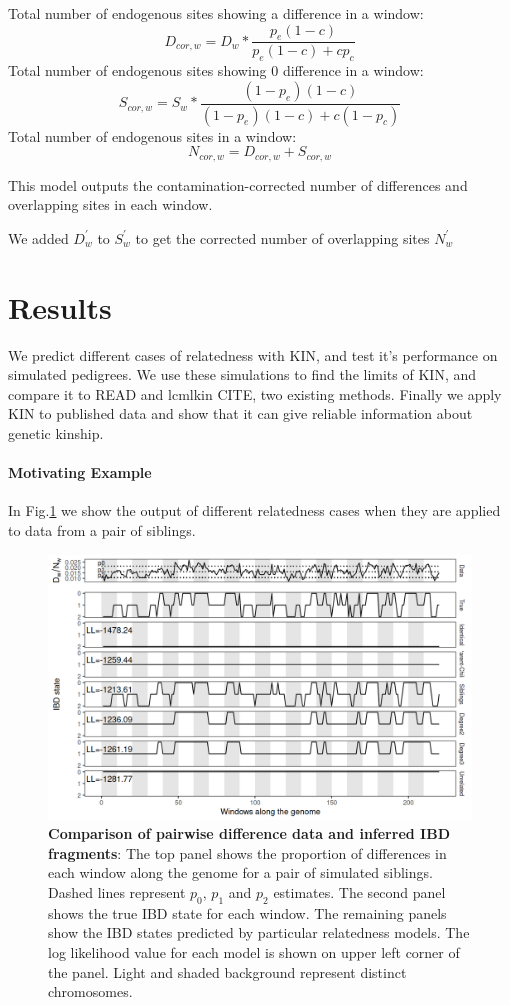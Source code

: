 \documentclass[12pt, letterpaper]{article}
\begin{document}
Total number of endogenous sites showing a difference in a window: 
$$D_{cor,w} = D_w* \frac{p_e(1-c)}{p_e(1-c) + c p_c} $$
Total number of endogenous sites showing 0 difference in a window: 
$$S_{cor,w} = S_w* \frac{(1-p_e)(1-c)}{(1-p_e)(1-c) + c (1-p_c)} $$
Total number of endogenous sites in a window:
$$N_{cor,w} = D_{cor,w} + S_{cor,w}$$

This model outputs the contamination-corrected number of differences and overlapping sites in each window.


We added $D_w^{'}$ to $S_w^{'}$ to get the corrected number of overlapping sites $N_w^{'}$  


\section{Results}\label{results}



We predict different cases of relatedness with KIN, and test it's performance on simulated pedigrees. We use these simulations to find the limits of KIN, and compare it to READ and lcmlkin CITE, two existing methods. Finally we apply KIN to published data and show that it can give reliable information about genetic kinship.

\paragraph{Motivating Example}
In Fig.\ref{fig1:ibd} we show the output of different relatedness cases when they are applied to data from a pair of siblings.

\begin{figure}[h!]
    \includegraphics[width=16cm]{plots/plotimg/IBDplot.png}
    \centering
    \caption{\textbf{Comparison of pairwise difference data  and inferred IBD fragments}:  The top panel shows the proportion of differences in each window along the genome for a pair of simulated siblings. Dashed lines represent $p_0$, $p_1$ and $p_2$ estimates. The second panel shows the true IBD state for each window. The remaining panels show the IBD states predicted by particular relatedness models. The log likelihood value for each model is shown on upper left corner of the panel. Light and shaded background represent distinct chromosomes.}
    \label{fig1:ibd}
\end{figure}
\end{document}

